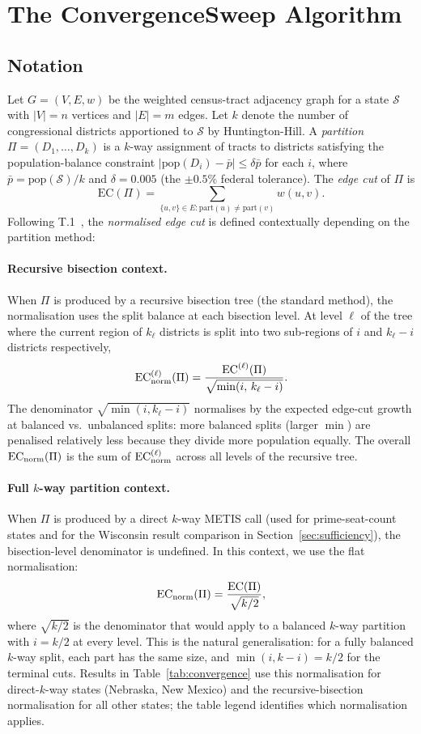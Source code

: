 \section{The ConvergenceSweep Algorithm}
\label{sec:algorithm}

\subsection{Notation}

Let $G = (V, E, w)$ be the weighted census-tract adjacency graph for a state
$\mathcal{S}$ with $|V| = n$ vertices and $|E| = m$ edges.
Let $k$ denote the number of congressional districts apportioned to
$\mathcal{S}$ by Huntington-Hill.
A \emph{partition} $\Pi = (D_1, \ldots, D_k)$ is a $k$-way assignment of
tracts to districts satisfying the population-balance constraint
$|\mathrm{pop}(D_i) - \bar{p}| \le \delta \bar{p}$ for each $i$, where
$\bar{p} = \mathrm{pop}(\mathcal{S})/k$ and $\delta = 0.005$ (the
$\pm 0.5\%$ federal tolerance).
The \emph{edge cut} of $\Pi$ is
\[
  \mathrm{EC}(\Pi) = \sum_{\{u,v\} \in E: \text{part}(u) \ne \text{part}(v)} w(u,v).
\]
Following T.1~\citep{b8paper}, the \emph{normalised edge cut} is defined
contextually depending on the partition method:

\paragraph{Recursive bisection context.}
When $\Pi$ is produced by a recursive bisection tree (the standard \ar{}
method), the normalisation uses the split balance at each bisection level.
At level $\ell$ of the tree where the current region of $k_\ell$ districts
is split into two sub-regions of $i$ and $k_\ell - i$ districts respectively,
\[
  \mathrm{EC}_{\mathrm{norm}}^{(\ell)}(\Pi) = \frac{\mathrm{EC}^{(\ell)}(\Pi)}{\sqrt{\min(i,\, k_\ell - i)}}.
\]
The denominator $\sqrt{\min(i, k_\ell - i)}$ normalises by the expected
edge-cut growth at balanced vs.\ unbalanced splits: more balanced splits
(larger $\min$) are penalised relatively less because they divide more population
equally.
The overall $\mathrm{EC}_{\mathrm{norm}}(\Pi)$ is the sum of $\mathrm{EC}_{\mathrm{norm}}^{(\ell)}$ across all levels
of the recursive tree.

\paragraph{Full $k$-way partition context.}
When $\Pi$ is produced by a direct $k$-way METIS call (used for prime-seat-count
states and for the Wisconsin result comparison in Section~\ref{sec:sufficiency}),
the bisection-level denominator is undefined.
In this context, we use the flat normalisation:
\[
  \mathrm{EC}_{\mathrm{norm}}(\Pi) = \frac{\mathrm{EC}(\Pi)}{\sqrt{k/2}},
\]
where $\sqrt{k/2}$ is the denominator that would apply to a balanced $k$-way
partition with $i = k/2$ at every level.
This is the natural generalisation: for a fully balanced $k$-way split, each
part has the same size, and $\min(i, k-i) = k/2$ for the terminal cuts.
Results in Table~\ref{tab:convergence} use this normalisation for
direct-$k$-way states (Nebraska, New Mexico) and the recursive-bisection
normalisation for all other states; the table legend identifies which
normalisation applies.

